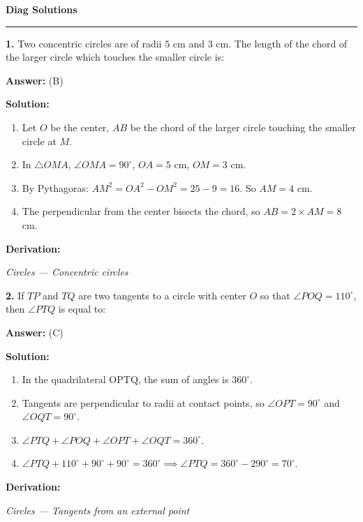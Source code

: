 \documentclass[12pt,a4paper]{exam}
\newcommand{\fitmath}[1]{%
  \sbox{\schmathbox}{$\displaystyle #1$}%
  \ifdim\wd\schmathbox>\linewidth
    \resizebox{\linewidth}{!}{\usebox{\schmathbox}}%
  \else
    \usebox{\schmathbox}%
  \fi}
\begin{document}
\thispagestyle{empty}
\begin{center}
  \textbf{\LARGE Diag Solutions} \\[0.3cm]
  \rule{\textwidth}{0.5pt}
\end{center}

\vspace{0.3cm}

\begin{questions}
\question \textbf{1.} Two concentric circles are of radii $5$ cm and $3$ cm. The length of the chord of the larger circle which touches the smaller circle is:

\textbf{Answer:}
(B)

\textbf{Solution:}
\begin{enumerate}
  \item Let $O$ be the center, $AB$ be the chord of the larger circle touching the smaller circle at $M$.
  \item In $\triangle OMA$, $\angle OMA = 90^\circ$, $OA = 5$ cm, $OM = 3$ cm.
  \item By Pythagoras: $AM^2 = OA^2 - OM^2 = 25 - 9 = 16$. So $AM = 4$ cm.
  \item The perpendicular from the center bisects the chord, so $AB = 2 \times AM = 8$ cm.
\end{enumerate}
\textbf{Derivation:}
\begin{center}
\fitmath{AB = 2\sqrt{5^2 - 3^2} = 2\sqrt{16} = 8}
\end{center}
\hfill \textit{Circles — Concentric circles}
\vspace{0.3cm}

\question \textbf{2.} If $TP$ and $TQ$ are two tangents to a circle with center $O$ so that $\angle POQ = 110^\circ$, then $\angle PTQ$ is equal to:

\textbf{Answer:}
(C)

\textbf{Solution:}
\begin{enumerate}
  \item In the quadrilateral $\text{OPTQ}$, the sum of angles is $360^\circ$.
  \item Tangents are perpendicular to radii at contact points, so $\angle OPT = 90^\circ$ and $\angle OQT = 90^\circ$.
  \item $\angle PTQ + \angle POQ + \angle OPT + \angle OQT = 360^\circ$.
  \item $\angle PTQ + 110^\circ + 90^\circ + 90^\circ = 360^\circ \implies \angle PTQ = 360^\circ - 290^\circ = 70^\circ$.
\end{enumerate}
\textbf{Derivation:}
\begin{center}
\fitmath{\angle PTQ = 180^\circ - 110^\circ = 70^\circ}
\end{center}
\hfill \textit{Circles — Tangents from an external point}
\vspace{0.3cm}


\end{questions}
\end{document}
